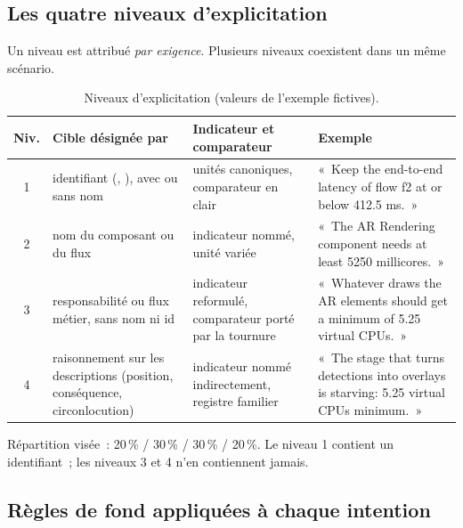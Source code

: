 \documentclass[11pt,a4paper]{article}
\newcommand{\code}[1]{\texttt{\detokenize{#1}}}
\begin{document}
\subsection{Les quatre niveaux d'explicitation}\label{sec:niveaux}

Un niveau est attribué \emph{par exigence}. Plusieurs niveaux coexistent dans un même scénario.

\begin{table}[h]
\centering
\caption{Niveaux d'explicitation (valeurs de l'exemple fictives).}
\small
\begin{tabularx}{\linewidth}{@{}cp{3.3cm}p{3.5cm}X@{}}
\toprule
Niv. & Cible désignée par & Indicateur et comparateur & Exemple \\
\midrule
1 & identifiant (\code{C2}, \code{f1}), avec ou sans nom & unités canoniques, comparateur en clair & «~Keep the end-to-end latency of flow f2 at or below 412.5 ms.~» \\
2 & nom du composant ou du flux & indicateur nommé, unité variée & «~The AR Rendering component needs at least 5250 millicores.~» \\
3 & responsabilité ou flux métier, sans nom ni id & indicateur reformulé, comparateur porté par la tournure & «~Whatever draws the AR elements should get a minimum of 5.25 virtual CPUs.~» \\
4 & raisonnement sur les descriptions (position, conséquence, circonlocution) & indicateur nommé indirectement, registre familier & «~The stage that turns detections into overlays is starving: 5.25 virtual CPUs minimum.~» \\
\bottomrule
\end{tabularx}
\end{table}

Répartition visée~: 20\,\% / 30\,\% / 30\,\% / 20\,\%. Le niveau 1 contient un identifiant~; les niveaux 3 et 4 n'en contiennent jamais.

\subsection{Règles de fond appliquées à chaque intention}
\end{document}
